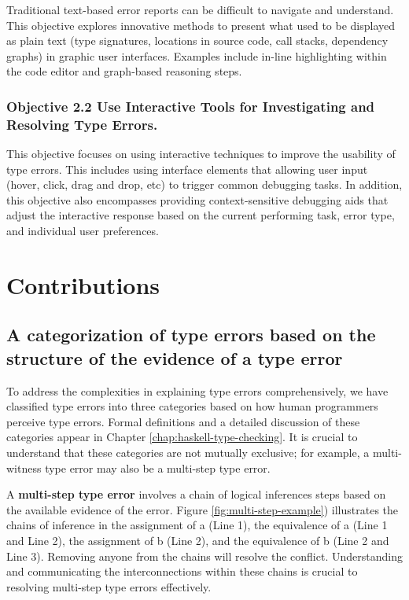 Traditional text-based error reports can be difficult to navigate and understand. This objective explores innovative methods to present what used to be displayed as plain text (type signatures, locations in source code, call stacks, dependency graphs) in graphic user interfaces. Examples include in-line highlighting within the code editor and graph-based reasoning steps.  

\subsubsection{Objective 2.2 Use Interactive Tools for Investigating and Resolving Type Errors.}

This objective focuses on using interactive techniques to improve the usability of type errors.  This includes using interface elements that allowing user input (hover, click, drag and drop, etc) to trigger common debugging tasks. In addition, this objective also encompasses providing context-sensitive debugging aids that adjust the interactive response based on the current performing task, error type, and individual user preferences.


\section{Contributions}

\subsection{A categorization of type errors based on the structure of the evidence of a type error}

To address the complexities in explaining type errors comprehensively, we have classified type errors into three categories based on how human programmers perceive type errors. Formal definitions and a detailed discussion of these categories appear in Chapter \ref{chap:haskell-type-checking}. It is crucial to understand that these categories are not mutually exclusive; for example, a multi-witness type error may also be a multi-step type error.

A \textbf{multi-step type error} involves a chain of logical inferences steps based on the available evidence of the error. Figure \ref{fig:multi-step-example}) illustrates the chains of inference in the assignment of a (Line 1), the equivalence of a (Line 1 and Line 2), the assignment of b (Line 2), and the equivalence of b (Line 2 and Line 3). Removing anyone from the chains will resolve the conflict. Understanding and communicating the interconnections within these chains is crucial to resolving multi-step type errors effectively.

